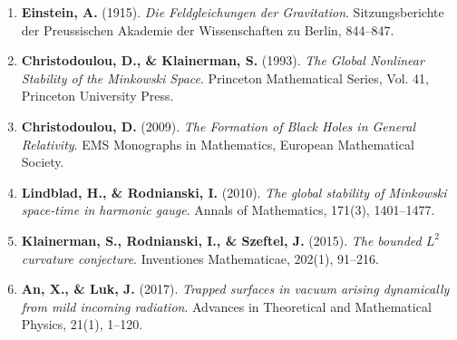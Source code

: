 \documentclass[11pt, a4paper]{article}
\begin{document}
\begin{enumerate}
    \item \textbf{Einstein, A.} (1915). \textit{Die Feldgleichungen der Gravitation}. Sitzungsberichte der Preussischen Akademie der Wissenschaften zu Berlin, 844--847.
    \item \textbf{Christodoulou, D., \& Klainerman, S.} (1993). \textit{The Global Nonlinear Stability of the Minkowski Space}. Princeton Mathematical Series, Vol. 41, Princeton University Press.
    \item \textbf{Christodoulou, D.} (2009). \textit{The Formation of Black Holes in General Relativity}. EMS Monographs in Mathematics, European Mathematical Society.
    \item \textbf{Lindblad, H., \& Rodnianski, I.} (2010). \textit{The global stability of Minkowski space-time in harmonic gauge}. Annals of Mathematics, 171(3), 1401--1477.
    \item \textbf{Klainerman, S., Rodnianski, I., \& Szeftel, J.} (2015). \textit{The bounded $L^2$ curvature conjecture}. Inventiones Mathematicae, 202(1), 91--216.
    \item \textbf{An, X., \& Luk, J.} (2017). \textit{Trapped surfaces in vacuum arising dynamically from mild incoming radiation}. Advances in Theoretical and Mathematical Physics, 21(1), 1--120.
\end{enumerate}
\end{document}
